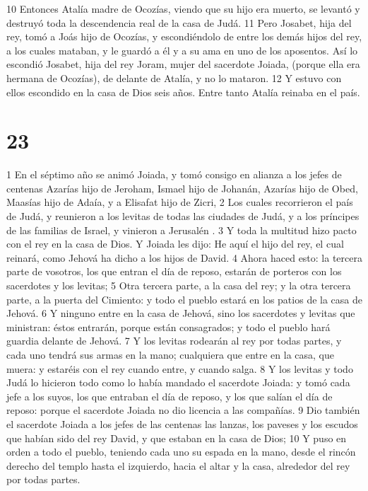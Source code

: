  
10 Entonces Atalía madre de Ocozías, viendo que su hijo era muerto, se levantó y destruyó toda la descendencia real de la casa de Judá.
11 Pero Josabet, hija del rey, tomó a Joás hijo de Ocozías, y escondiéndolo de entre los demás hijos del rey, a los cuales mataban, y le guardó a él y a su ama en uno de los aposentos. Así lo escondió Josabet, hija del rey Joram, mujer del sacerdote Joiada, (porque ella era hermana de Ocozías), de delante de Atalía, y no lo mataron.
12 Y estuvo con ellos escondido en la casa de Dios seis años. Entre tanto Atalía reinaba en el país.

\chapter{23}


1 En el séptimo año se animó Joiada, y tomó consigo en alianza a los jefes de centenas Azarías hijo de Jeroham, Ismael hijo de Johanán,  Azarías hijo de Obed, Maasías hijo de Adaía, y a Elisafat hijo de Zicri,
2 Los cuales recorrieron el país de Judá, y reunieron a los levitas de todas las ciudades de Judá, y a los príncipes de las familias de Israel, y vinieron a Jerusalén .
3 Y toda la multitud hizo pacto con el rey en la casa de Dios. Y Joiada les dijo: He aquí el hijo del rey, el cual reinará, como Jehová ha dicho a los hijos de David.
4 Ahora haced esto: la tercera parte de vosotros, los que entran el día de reposo, estarán de porteros con los sacerdotes y los levitas;
5 Otra tercera parte, a la casa del rey; y la otra tercera parte, a la puerta del Cimiento: y todo el pueblo estará en los patios de la casa de Jehová.
6 Y ninguno entre en la casa de Jehová, sino los sacerdotes y levitas que ministran: éstos entrarán, porque están consagrados; y todo el pueblo hará guardia delante de Jehová.
7 Y los levitas rodearán al rey por todas partes, y cada uno tendrá sus armas en la mano;  cualquiera que entre en la casa, que muera: y estaréis con el rey cuando entre, y cuando salga.
8 Y los levitas y todo Judá lo hicieron todo como lo había mandado el sacerdote Joiada: y tomó cada jefe a los suyos, los que entraban el día de reposo, y los que salían el día de reposo: porque el sacerdote Joiada no dio licencia a las compañías.
9 Dio también el sacerdote Joiada a los jefes de las centenas las lanzas, los paveses y los escudos que habían sido del rey David, y que estaban en la casa de Dios;
10 Y puso en orden a todo el pueblo, teniendo cada uno su espada en la mano, desde el rincón derecho del templo hasta el izquierdo, hacia el altar y la casa, alrededor del rey por todas partes.
